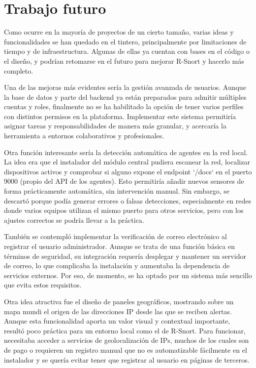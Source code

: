 \documentclass[11pt,a4paper,twoside]{report}
\begin{document}
\section*{Trabajo futuro}

Como ocurre en la mayoría de proyectos de un cierto tamaño, varias ideas y funcionalidades se han quedado en el tintero, principalmente por limitaciones de tiempo y de infraestructura. Algunas de ellas ya cuentan con bases en el código o el diseño, y podrían retomarse en el futuro para mejorar R-Snort y hacerlo más completo.\newline

Una de las mejoras más evidentes sería la gestión avanzada de usuarios. Aunque la base de datos y parte del backend ya están preparados para admitir múltiples cuentas y roles, finalmente no se ha habilitado la opción de tener varios perfiles con distintos permisos en la plataforma. Implementar este sistema permitiría asignar tareas y responsabilidades de manera más granular, y acercaría la herramienta a entornos colaborativos y profesionales.\newline

Otra función interesante sería la detección automática de agentes en la red local. La idea era que el instalador del módulo central pudiera escanear la red, localizar dispositivos activos y comprobar si alguno expone el endpoint `/docs` en el puerto 9000 (propio del API de los agentes). Esto permitiría añadir nuevos sensores de forma prácticamente automática, sin intervención manual. Sin embargo, se descartó porque podía generar errores o falsas detecciones, especialmente en redes donde varios equipos utilizan el mismo puerto para otros servicios, pero con los ajustes correctos se podría llevar a la práctica.\newline

También se contempló implementar la verificación de correo electrónico al registrar el usuario administrador. Aunque se trata de una función básica en términos de seguridad, su integración requería desplegar y mantener un servidor de correo, lo que complicaba la instalación y aumentaba la dependencia de servicios externos. Por eso, de momento, se ha optado por un sistema más sencillo que evita estos requisitos.\newline

Otra idea atractiva fue el diseño de paneles geográficos, mostrando sobre un mapa mundi el origen de las direcciones IP desde las que se reciben alertas. Aunque esta funcionalidad aporta un valor visual y contextual importante, resultó poco práctica para un entorno local como el de R-Snort. Para funcionar, necesitaba acceder a servicios de geolocalización de IPs, muchos de los cuales son de pago o requieren un registro manual que no es automatizable fácilmente en el instalador y se quería evitar tener que registrar al usuario en páginas de terceros.\newline
\end{document}

